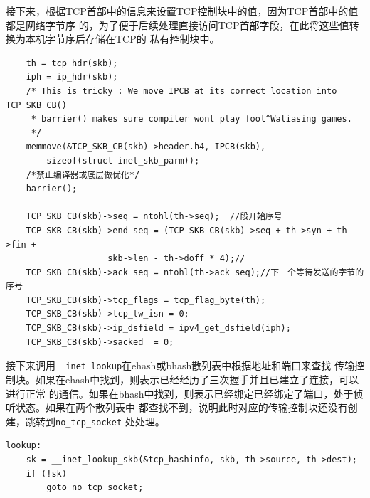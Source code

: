 	接下来，根据TCP首部中的信息来设置TCP控制块中的值，因为TCP首部中的值都是网络字节序
	的，为了便于后续处理直接访问TCP首部字段，在此将这些值转换为本机字节序后存储在TCP的
	私有控制块中。
\begin{verbatim}
	th = tcp_hdr(skb);
	iph = ip_hdr(skb);
	/* This is tricky : We move IPCB at its correct location into TCP_SKB_CB()
	 * barrier() makes sure compiler wont play fool^Waliasing games.
	 */
	memmove(&TCP_SKB_CB(skb)->header.h4, IPCB(skb),
		sizeof(struct inet_skb_parm));
	/*禁止编译器或底层做优化*/
	barrier();

	TCP_SKB_CB(skb)->seq = ntohl(th->seq);	//段开始序号
	TCP_SKB_CB(skb)->end_seq = (TCP_SKB_CB(skb)->seq + th->syn + th->fin +
				    skb->len - th->doff * 4);//
	TCP_SKB_CB(skb)->ack_seq = ntohl(th->ack_seq);//下一个等待发送的字节的序号
	TCP_SKB_CB(skb)->tcp_flags = tcp_flag_byte(th);
	TCP_SKB_CB(skb)->tcp_tw_isn = 0;
	TCP_SKB_CB(skb)->ip_dsfield = ipv4_get_dsfield(iph);
	TCP_SKB_CB(skb)->sacked	 = 0;
\end{verbatim}
	
	接下来调用\texttt{__inet_lookup}在ehash或bhash散列表中根据地址和端口来查找
	传输控制块。如果在ehash中找到，则表示已经经历了三次握手并且已建立了连接，可以进行正常
	的通信。如果在bhash中找到，则表示已经绑定已经绑定了端口，处于侦听状态。如果在两个散列表中
	都查找不到，说明此时对应的传输控制块还没有创建，跳转到\texttt{no_tcp_socket}
	处处理。
\begin{verbatim}
lookup:
	sk = __inet_lookup_skb(&tcp_hashinfo, skb, th->source, th->dest);
	if (!sk)
		goto no_tcp_socket;
\end{verbatim}
	
